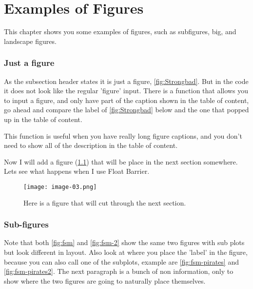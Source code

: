 \chapter{Examples of Figures}
\label{cha:important-chapter}
This chapter shows you some examples of figures, such as subfigures,  big, and landscape figures.


\subsection{Just a figure}
As the subsection header states it is just a figure, \ref{fig:Strongbad}. But in the code it does not look like the regular 'figure' input. There is a function that allows you to input a figure, and only have part of the caption shown in the table of content, go ahead and compare the label of \ref{fig:Strongbad} below and the one that popped up in the table of content.


This function is useful when you have really long figure captions, and you don't need to show all of the description in the table of content.

Now I will add a figure (\ref{fig:CutvsFloatBarrier}) that will be place in the next section somewhere. Lets see what happens when I use Float Barrier.

\begin{figure}[ht]
	\centering
	\texttt{[image: image-03.png]}
	\caption{Here is a figure that will cut through the next section.}
	\label{fig:CutvsFloatBarrier}
\end{figure}

\FloatBarrier

\subsection{Sub-figures}

Note that both \ref{fig:fsm} and \ref{fig:fsm-2} show the same two figures with sub plots but look different in layout. Also look at where you place the 'label' in the figure, because you can also call one of the subplots, example are \ref{fig:fsm-pirates} and \ref{fig:fsm-pirates2}. The next paragraph is a bunch of non information, only to show where the two figures are going to naturally place themselves.

